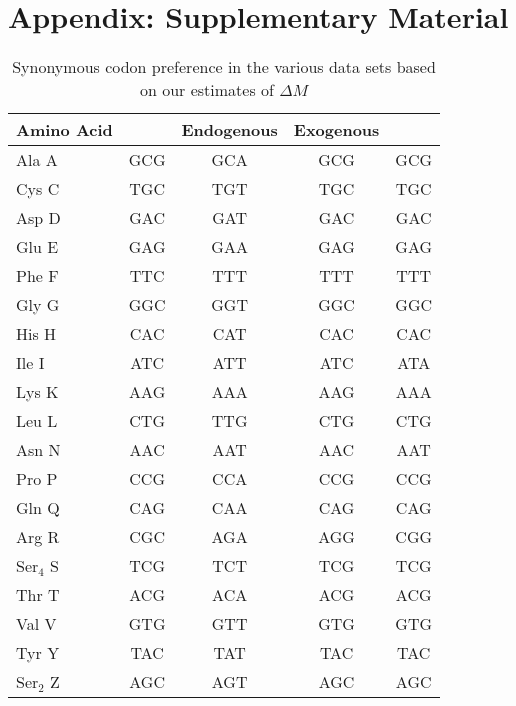 %
%

\clearpage
\pagebreak
\section{Appendix: Supplementary Material}


\singlespace
\begin{table}[H]
    \centering
    \caption{Synonymous codon preference in the various data sets based on our estimates of $\Delta M$}
\begin{tabular}{  l  c  c  c  c  }
\hline
	Amino Acid & \gossypii & Endogenous & Exogenous & \kluyveri \\ \hline
	Ala A & GCG & GCA & GCG & GCG \\ 
	Cys C & TGC & TGT & TGC & TGC \\ 
	Asp D & GAC & GAT & GAC & GAC \\ 
	Glu E & GAG & GAA & GAG & GAG \\ 
	Phe F & TTC & TTT & TTT & TTT \\ 
	Gly G & GGC & GGT & GGC & GGC \\ 
	His H & CAC & CAT & CAC & CAC \\ 
	Ile I & ATC & ATT & ATC & ATA \\ 
	Lys K & AAG & AAA & AAG & AAA \\ 
	Leu L & CTG & TTG & CTG & CTG \\ 
	Asn N & AAC & AAT & AAC & AAT \\ 
	Pro P & CCG & CCA & CCG & CCG \\ 
	Gln Q & CAG & CAA & CAG & CAG \\ 
	Arg R & CGC & AGA & AGG & CGG \\ 
	Ser$_4$ S & TCG & TCT & TCG & TCG \\
	Thr T & ACG & ACA & ACG & ACG \\ 
	Val V & GTG & GTT & GTG & GTG \\ 
	Tyr Y & TAC & TAT & TAC & TAC \\ 
	Ser$_2$ Z & AGC & AGT & AGC & AGC \\ \hline
\end{tabular}
    \label{tab:codon_pref_dm}
\end{table}

\clearpage

